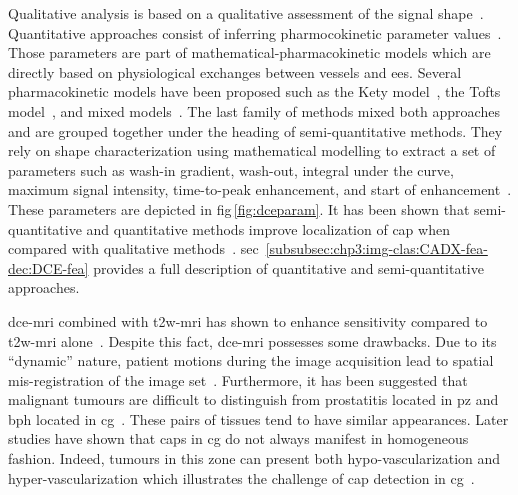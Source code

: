 Qualitative analysis is based on a qualitative assessment of the signal shape~\cite{Hoeks2011}.
Quantitative approaches consist of inferring pharmocokinetic parameter values~\cite{Tofts2010}.
Those parameters are part of mathematical-pharmacokinetic models which are directly based on physiological exchanges between vessels and \ac{ees}.
Several pharmacokinetic models have been proposed such as the Kety model~\cite{Kety1951}, the Tofts model~\cite{Tofts1997}, and mixed models~\cite{Larsson1996,StLawrence1998}.
The last family of methods mixed both approaches and are grouped together under the heading of semi-quantitative methods.
They rely on shape characterization using mathematical modelling to extract a set of parameters such as wash-in gradient, wash-out, integral under the curve, maximum signal intensity, time-to-peak enhancement, and start of enhancement~\cite{Hoeks2011,Verma2012}.
These parameters are depicted in \acs{fig}\,\ref{fig:dceparam}.
It has been shown that semi-quantitative and quantitative methods improve localization of \ac{cap} when compared with qualitative methods~\cite{Rosenkrantz2013}.
\Ac{sec}~\ref{subsubsec:chp3:img-clas:CADX-fea-dec:DCE-fea} provides a full description of quantitative and semi-quantitative approaches.

\ac{dce}-\ac{mri} combined with \ac{t2w}-\ac{mri} has shown to enhance sensitivity compared to \ac{t2w}-\ac{mri} alone~\cite{Jager1997,Kim2005,Schlemmer2004,Zelhof2009}.
Despite this fact, \ac{dce}-\ac{mri} possesses some drawbacks.
Due to its ``dynamic'' nature, patient motions during the image acquisition lead to spatial mis-registration of the image set~\cite{Verma2012}.
Furthermore, it has been suggested that malignant tumours are difficult to distinguish from prostatitis located in \ac{pz} and \ac{bph} located in \ac{cg}~\cite{Hoeks2011,Verma2012}.
These pairs of tissues tend to have similar appearances.
Later studies have shown that \acp{cap} in \ac{cg} do not always manifest in homogeneous fashion.
Indeed, tumours in this zone can present both hypo-vascularization and hyper-vascularization which illustrates the challenge of \ac{cap} detection in \ac{cg}~\cite{Niekerk2013}.

